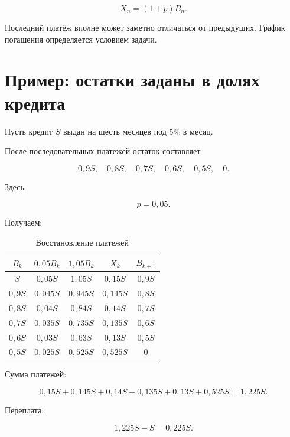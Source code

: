 \documentclass[a4paper,12pt]{article}
\begin{document}
\[
X_n=(1+p)B_n.
\]

Последний платёж вполне может заметно отличаться от предыдущих.
График погашения определяется условием задачи.


\section{Пример: остатки заданы в долях кредита}

Пусть кредит \(S\) выдан на шесть месяцев под \(5\%\) в месяц.

После последовательных платежей остаток составляет

\[
0{,}9S,\quad
0{,}8S,\quad
0{,}7S,\quad
0{,}6S,\quad
0{,}5S,\quad
0.
\]

Здесь

\[
p=0{,}05.
\]

Получаем:

\begin{table}[h]
\centering
\caption{Восстановление платежей}
\small
\renewcommand{\arraystretch}{1.3}
\begin{tabular}{ccccc}
\toprule
\(B_k\) &
\(0{,}05B_k\) &
\(1{,}05B_k\) &
\(X_k\) &
\(B_{k+1}\) \\
\midrule
\(S\) &
\(0{,}05S\) &
\(1{,}05S\) &
\(0{,}15S\) &
\(0{,}9S\) \\

\(0{,}9S\) &
\(0{,}045S\) &
\(0{,}945S\) &
\(0{,}145S\) &
\(0{,}8S\) \\

\(0{,}8S\) &
\(0{,}04S\) &
\(0{,}84S\) &
\(0{,}14S\) &
\(0{,}7S\) \\

\(0{,}7S\) &
\(0{,}035S\) &
\(0{,}735S\) &
\(0{,}135S\) &
\(0{,}6S\) \\

\(0{,}6S\) &
\(0{,}03S\) &
\(0{,}63S\) &
\(0{,}13S\) &
\(0{,}5S\) \\

\(0{,}5S\) &
\(0{,}025S\) &
\(0{,}525S\) &
\(0{,}525S\) &
\(0\) \\
\bottomrule
\end{tabular}
\end{table}

Сумма платежей:

\[
0{,}15S+0{,}145S+0{,}14S+
0{,}135S+0{,}13S+0{,}525S
=
1{,}225S.
\]

Переплата:

\[
1{,}225S-S=0{,}225S.
\]
\end{document}
